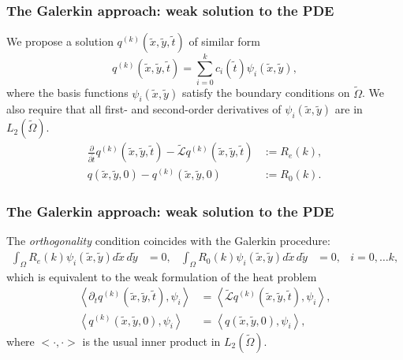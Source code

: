 \documentclass{beamer}
\begin{document}
\begin{frame}
  \frametitle{The Galerkin approach: weak solution to the PDE}
  We propose a solution $q^{(k)}(\tilde{x},\tilde{y},\tilde{t})$ of similar
  form
  \[
    q^{(k)}(\tilde{x},\tilde{y},\tilde{t}) = \sum_{i=0}^k c_i(\tilde{t})
    \psi_i(\tilde{x},\tilde{y}),
  \]
  where the basis functions $\psi_i(\tilde{x},\tilde{y})$ satisfy the
  boundary conditions on $\tilde{\Omega}$. We also require that all
  first- and second-order derivatives of $\psi_i(\tilde{x},\tilde{y})$
  are in $L_2(\tilde{\Omega})$.
  \begin{align*}
  \frac{\partial}{\partial \tilde{t}} q^{(k)}(\tilde{x},\tilde{y},\tilde{t}) - \tilde{\mathcal{L}}q^{(k)}(\tilde{x},\tilde{y},\tilde{t}) &:= R_e(k), \\
  q(\tilde{x},\tilde{y},0) - q^{(k)}(\tilde{x},\tilde{y},0) &:= R_0(k).
  \end{align*}
\end{frame}
\begin{frame}
  \frametitle{The Galerkin approach: weak solution to the PDE}
  The \textit{orthogonality} condition coincides with the
  Galerkin procedure:
  \begin{align*}
    \displaystyle \int_{\Omega} R_e(k) \psi_i(\tilde{x},\tilde{y}) d\tilde{x}\,d\tilde{y} &= 0,& \displaystyle \int_{\Omega} R_0(k) \psi_i(\tilde{x},\tilde{y}) d\tilde{x}\,d\tilde{y} &= 0,& i = 0,\ldots k, 
  \end{align*}
  which is equivalent to the weak formulation of the heat problem
  \begin{align*}
    \left< \partial_t q^{(k)}(\tilde{x},\tilde{y},\tilde{t}), \psi_i \right> &= \left<\tilde{\mathcal{L}}q^{(k)}(\tilde{x},\tilde{y},\tilde{t}), \psi_i \right>, \\
    \left< q^{(k)}(\tilde{x},\tilde{y},0), \psi_i \right> &= \left<q(\tilde{x},\tilde{y},0), \psi_i\right>,
  \end{align*}
  where $<\cdot, \cdot>$ is the usual inner product in
  $L_2(\tilde{\Omega})$.
\end{frame}
\end{document}
